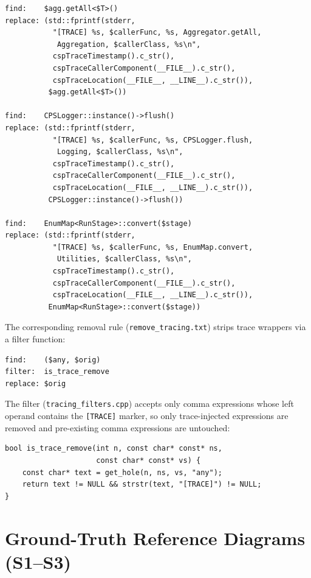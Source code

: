 \begin{verbatim}
find:    $agg.getAll<$T>()
replace: (std::fprintf(stderr,
           "[TRACE] %s, $callerFunc, %s, Aggregator.getAll,
            Aggregation, $callerClass, %s\n",
           cspTraceTimestamp().c_str(),
           cspTraceCallerComponent(__FILE__).c_str(),
           cspTraceLocation(__FILE__, __LINE__).c_str()),
          $agg.getAll<$T>())

find:    CPSLogger::instance()->flush()
replace: (std::fprintf(stderr,
           "[TRACE] %s, $callerFunc, %s, CPSLogger.flush,
            Logging, $callerClass, %s\n",
           cspTraceTimestamp().c_str(),
           cspTraceCallerComponent(__FILE__).c_str(),
           cspTraceLocation(__FILE__, __LINE__).c_str()),
          CPSLogger::instance()->flush())

find:    EnumMap<RunStage>::convert($stage)
replace: (std::fprintf(stderr,
           "[TRACE] %s, $callerFunc, %s, EnumMap.convert,
            Utilities, $callerClass, %s\n",
           cspTraceTimestamp().c_str(),
           cspTraceCallerComponent(__FILE__).c_str(),
           cspTraceLocation(__FILE__, __LINE__).c_str()),
          EnumMap<RunStage>::convert($stage))
\end{verbatim}

The corresponding removal rule (\texttt{remove\_tracing.txt}) strips
trace wrappers via a filter function:

\begin{verbatim}
find:    ($any, $orig)
filter:  is_trace_remove
replace: $orig
\end{verbatim}

The filter (\texttt{tracing\_filters.cpp}) accepts only comma
expressions whose left operand contains the \texttt{[TRACE]} marker, so
only trace-injected expressions are removed and pre-existing comma
expressions are untouched:

\begin{verbatim}
bool is_trace_remove(int n, const char* const* ns,
                     const char* const* vs) {
    const char* text = get_hole(n, ns, vs, "any");
    return text != NULL && strstr(text, "[TRACE]") != NULL;
}
\end{verbatim}

\section{Ground-Truth Reference Diagrams (S1--S3)}
\label{sec:appendix-groundtruth}

